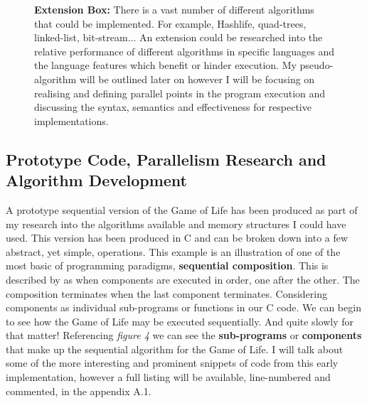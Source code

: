 \documentclass[11pt]{article} %
\begin{document}
\begin{figure}
\begin{mdframed}
{\bf Extension Box:} There is a vast number of different algorithms that could be implemented. For example, Hashlife, quad-trees, linked-list, bit-stream... An extension could be researched into the relative performance of different algorithms in specific languages and the language features which benefit or hinder execution. My pseudo-algorithm will be outlined later on however I will be focusing on realising and defining parallel points in the program execution and discussing the syntax, semantics and effectiveness for respective implementations.
\end{mdframed} 
\end{figure} 
\subsection{Prototype Code, Parallelism Research and Algorithm Development}
A prototype sequential version of the Game of Life has been produced as part of my research into the algorithms available and memory structures I could have used. This version has been produced in C and can be broken down into a few abstract, yet simple, operations. This example is an illustration of one of the most basic of programming paradigms, {\bf sequential composition}. This is described by \cite[p68]{ref9} as when components are executed in order, one after the other. The composition terminates when the last component terminates. Considering components as individual sub-programs or functions in our C code. We can begin to see how the Game of Life may be executed sequentially. And quite slowly for that matter! Referencing {\it figure 4} we can see the {\bf sub-programs} or {\bf components} that make up the sequential algorithm for the Game of Life. I will talk about some of the more interesting and prominent snippets of code from this early implementation, however a full listing will be available, line-numbered and commented, in the appendix A.1.\\
\end{document}
